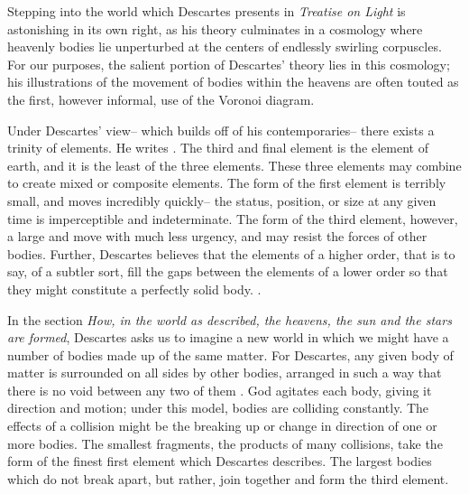 \documentclass[12pt,twoside]{reedthesis}
\begin{document}
    Stepping into the world which Descartes presents in \emph{Treatise on Light} is astonishing in its own right, as his theory culminates in a cosmology where heavenly bodies lie unperturbed at the centers of endlessly swirling corpuscles. For our purposes, the salient portion of Descartes' theory lies in this cosmology; his illustrations of the movement of bodies within the heavens are often touted as the first, however informal, use of the Voronoi diagram. \par

    Under Descartes' view-- which builds off of his contemporaries-- there exists a trinity of elements. He writes \citep[][p. 17]{descartes}. The third and final element is the element of earth, and it is the least  of the three elements. These three elements may combine to create mixed or composite elements. The form of the first element is terribly small, and moves incredibly quickly-- the status, position, or size at any given time is imperceptible and indeterminate. The form of the third element, however, a large and move with much less urgency, and may resist the forces of other bodies. Further, Descartes believes that the elements of a higher order, that is to say, of a subtler sort, fill the gaps between the elements of a lower order so that they might constitute a perfectly solid body.  \citep[][p. 17]{descartes}. \par 

    In the section \emph{How, in the world as described, the heavens, the sun and the stars are formed}, Descartes asks us to imagine a new world in which we might have a number of bodies made up of the same matter. For Descartes, any given body of matter is surrounded on all sides by other bodies, arranged in such a way that there is no void between any two of them \citep[][p. 25]{descartes}. God agitates each body, giving it direction and motion; under this model, bodies are colliding constantly. The effects of a collision might be the breaking up or change in direction of one or more bodies. The smallest fragments, the products of many collisions, take the form of the finest first element which Descartes describes. The largest bodies which do not break apart, but rather, join together and form the third element. \par
\end{document}
